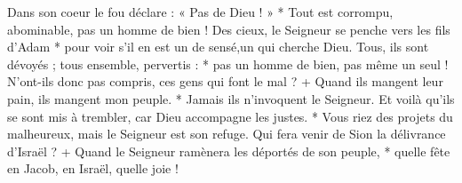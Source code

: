 Dans son coeur le fou déclare : « Pas de Dieu ! » *
\versseparator
Tout est corrompu, abominable,
pas un homme de bien !
\versseparator
Des cieux, le Seigneur se penche vers les fils d'Adam *
pour voir s'il en est un de sensé,un qui cherche Dieu.
\versseparator
Tous, ils sont dévoyés ; tous ensemble, pervertis : *
pas un homme de bien, pas même un seul !
\versseparator
N'ont-ils donc pas compris,
ces gens qui font le mal ? +
Quand ils mangent leur pain,
ils mangent mon peuple. *
Jamais ils n'invoquent le Seigneur.
\versseparator
Et voilà qu'ils se sont mis à trembler,
car Dieu accompagne les justes. *
\versseparator
Vous riez des projets du malheureux,
mais le Seigneur est son refuge.
\versseparator
Qui fera venir de Sion la délivrance d'Israël ? +
Quand le Seigneur ramènera les déportés de son peuple, *
quelle fête en Jacob, en Israël, quelle joie !
